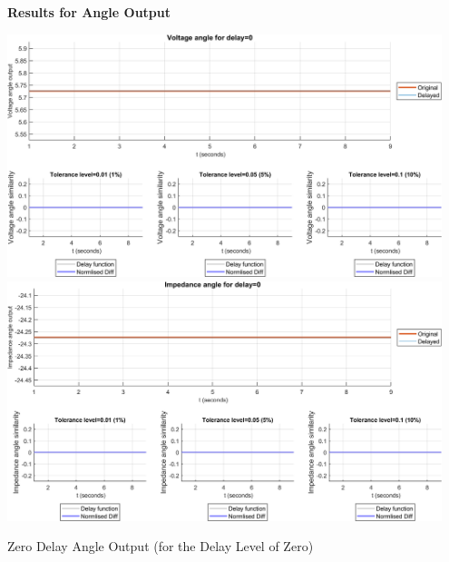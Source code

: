 {\newpage \textbf{Results for Angle Output}

\begin{floatingfigure}[p]{\textwidth}
    \includegraphics[width=0.95\textwidth]{PMUsim-figures/DelayOf_0/Zero_vAngle.png}    
     \includegraphics[width=0.95\textwidth]{PMUsim-figures/DelayOf_0/Zero_iAngle.png} 
          \caption{Zero Delay Angle Output (for the Delay Level of Zero)}

              \label{fig:PMUsim_Zero_Angle}
\end{floatingfigure}


}
